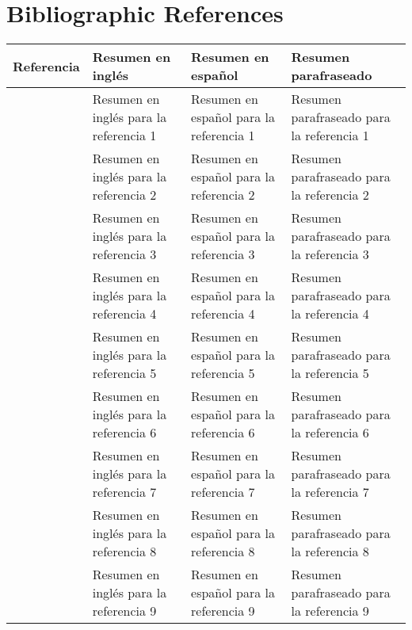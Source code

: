 \documentclass[10pt,letterpaper,final]{article}
\begin{document}
\section*{Bibliographic References}
\begin{center}
   \begin{tabularx}{\textwidth}{|c|X|X|X|}
      \hline
      \textbf{Referencia} & \textbf{Resumen en inglés} & \textbf{Resumen en español} & \textbf{Resumen parafraseado} \\
      \hline
      \cite{alam2022cost} & Resumen en inglés para la referencia 1 & Resumen en español para la referencia 1 & Resumen parafraseado para la referencia 1 \\
      \hline
      \cite{althoff2009model} & Resumen en inglés para la referencia 2 & Resumen en español para la referencia 2 & Resumen parafraseado para la referencia 2 \\
      \hline
      \cite{bachute2021autonomous} & Resumen en inglés para la referencia 3 & Resumen en español para la referencia 3 & Resumen parafraseado para la referencia 3 \\
      \hline
      \cite{cai2021vision} & Resumen en inglés para la referencia 4 & Resumen en español para la referencia 4 & Resumen parafraseado para la referencia 4 \\
      \hline
      \cite{konecny2022motion} & Resumen en inglés para la referencia 5 & Resumen en español para la referencia 5 & Resumen parafraseado para la referencia 5 \\
      \hline
      \cite{li2022human} & Resumen en inglés para la referencia 6 & Resumen en español para la referencia 6 & Resumen parafraseado para la referencia 6 \\
      \hline
      \cite{pavel2022vision} & Resumen en inglés para la referencia 7 & Resumen en español para la referencia 7 & Resumen parafraseado para la referencia 7 \\
      \hline
      \cite{prasad2023design} & Resumen en inglés para la referencia 8 & Resumen en español para la referencia 8 & Resumen parafraseado para la referencia 8 \\
      \hline
      \cite{sushma2023dynamic} & Resumen en inglés para la referencia 9 & Resumen en español para la referencia 9 & Resumen parafraseado para la referencia 9 \\
      \hline
   \end{tabularx}
\end{center}
\nocite{*}


\end{document}
